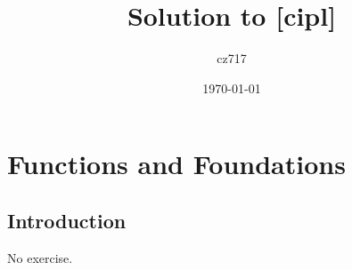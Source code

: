 \documentclass[a4paper]{report}
\begin{document}
  \title{Solution to [cipl]}
  \author{cz717}
  \date{\today}
  \maketitle



\part{Functions and Foundations}
  \chapter{Introduction}
    No exercise.
  
  
\end{document}

